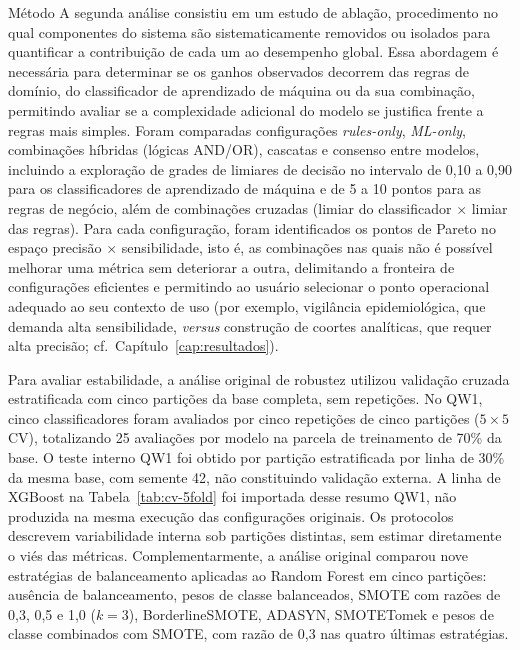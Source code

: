 \begin{chapter}{Método}
A segunda análise consistiu em um estudo de ablação, procedimento no qual componentes do sistema são sistematicamente removidos ou isolados para quantificar a contribuição de cada um ao desempenho global. Essa abordagem é necessária para determinar se os ganhos observados decorrem das regras de domínio, do classificador de aprendizado de máquina ou da sua combinação, permitindo avaliar se a complexidade adicional do modelo se justifica frente a regras mais simples. Foram comparadas configurações \textit{rules-only}, \textit{ML-only}, combinações híbridas (lógicas AND/OR), cascatas e consenso entre modelos, incluindo a exploração de grades de limiares de decisão no intervalo de 0,10 a 0,90 para os classificadores de aprendizado de máquina e de 5 a 10 pontos para as regras de negócio, além de combinações cruzadas (limiar do classificador $\times$ limiar das regras). Para cada configuração, foram identificados os pontos de Pareto no espaço precisão $\times$ sensibilidade, isto é, as combinações nas quais não é possível melhorar uma métrica sem deteriorar a outra, delimitando a fronteira de configurações eficientes e permitindo ao usuário selecionar o ponto operacional adequado ao seu contexto de uso (por exemplo, vigilância epidemiológica, que demanda alta sensibilidade, \textit{versus} construção de coortes analíticas, que requer alta precisão; cf.\ Capítulo~\ref{cap:resultados}).

Para avaliar estabilidade, a análise original de robustez utilizou validação cruzada estratificada com cinco partições da base completa, sem repetições. No QW1, cinco classificadores foram avaliados por cinco repetições de cinco partições ($5 \times 5$ CV), totalizando 25 avaliações por modelo na parcela de treinamento de 70\% da base. O teste interno QW1 foi obtido por partição estratificada por linha de 30\% da mesma base, com semente 42, não constituindo validação externa. A linha de XGBoost na Tabela~\ref{tab:cv-5fold} foi importada desse resumo QW1, não produzida na mesma execução das configurações originais. Os protocolos descrevem variabilidade interna sob partições distintas, sem estimar diretamente o viés das métricas. Complementarmente, a análise original comparou nove estratégias de balanceamento aplicadas ao Random Forest em cinco partições: ausência de balanceamento, pesos de classe balanceados, SMOTE com razões de 0,3, 0,5 e 1,0 ($k=3$), BorderlineSMOTE, ADASYN, SMOTETomek e pesos de classe combinados com SMOTE, com razão de 0,3 nas quatro últimas estratégias.


\end{chapter}
